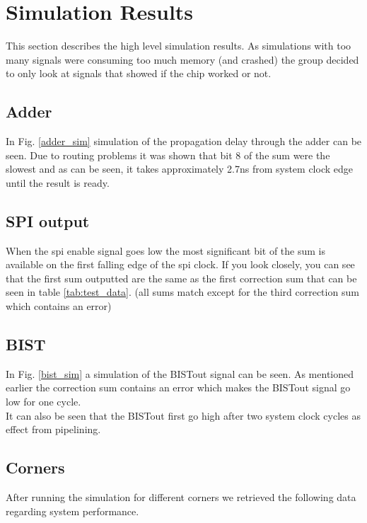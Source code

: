 \section{Simulation Results} \label{sec:simulation_results}
This section describes the high level simulation results. As simulations with too many signals were consuming too much memory (and crashed) the group decided to only look at signals that showed if the chip worked or not.\\

\subsection{Adder}
In Fig. \ref{adder_sim} simulation of the propagation delay through the adder can be seen. Due to routing problems it was shown that bit 8 of the sum were the slowest and as can be seen, it takes approximately 2.7ns from system clock edge until the result is ready. \\

\subsection{SPI output}
When the spi enable signal goes low the most significant bit of the sum is available on the first falling edge of the spi clock. If you look closely, you can see that the first sum outputted are the same as the first correction sum that can be seen in table \ref{tab:test_data}. (all sums match except for the third correction sum which contains an error)\\

\subsection{BIST}
In Fig. \ref{bist_sim} a simulation of the BISTout signal can be seen. As mentioned earlier the correction sum contains an error which makes the BISTout signal go low for one cycle. \\
It can also be seen that the BISTout first go high after two system clock cycles as effect from pipelining.\\



\subsection{Corners}
After running the simulation for different corners we retrieved the following data regarding system performance. 


